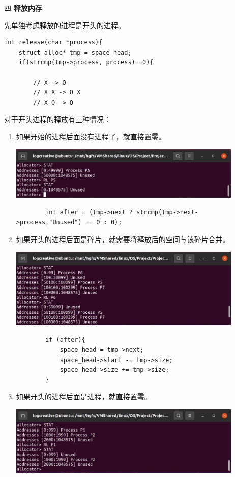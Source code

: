 \documentclass[12pt,a4paper]{article}
\newenvironment{problems}{\begin{list}{}{\renewcommand{\makelabel}[1]{\textbf{##1}\hfil}}}{\end{list}}
\begin{document}
\begin{problems}
    \item[四] \textbf{释放内存}
    
    先单独考虑释放的进程是开头的进程。
    \begin{lstlisting}
int release(char *process){
    struct alloc* tmp = space_head;
    if(strcmp(tmp->process, process)==0){

        // X -> O
        // X X -> O X
        // X O -> O
    \end{lstlisting}
    对于开头进程的释放有三种情况：
    \begin{enumerate}
        \item 如果开始的进程后面没有进程了，就直接置零。
        
        \includegraphics[width=0.88\textwidth]{RL11.png}

        \begin{lstlisting}
        int after = (tmp->next ? strcmp(tmp->next->process,"Unused") == 0 : 0);
        \end{lstlisting}
        \item 如果开头的进程后面是碎片，就需要将释放后的空间与该碎片合并。
        
        \includegraphics[width=0.88\textwidth]{RL12.png}

        \begin{lstlisting}
        if (after){
            space_head = tmp->next;
            space_head->start -= tmp->size;
            space_head->size += tmp->size;
        }
        \end{lstlisting}
        \item 如果开头的进程后面是进程，就直接置零。
        
        \includegraphics[width=0.88\textwidth]{RL13.png}


\end{enumerate}
\end{problems}
\end{document}
